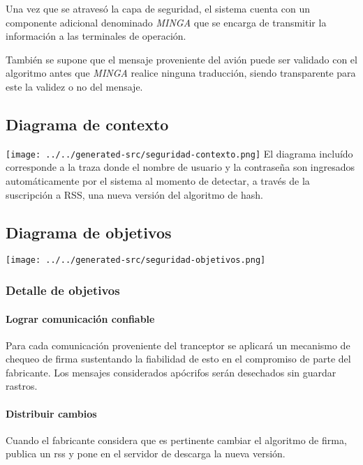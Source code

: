 Una vez que se atravesó la capa de seguridad, el sistema cuenta con un componente adicional denominado \emph{MINGA} que se encarga de transmitir la información a las terminales de operación.

También se supone que el mensaje proveniente del avión puede ser validado con el algoritmo antes que \emph{MINGA} realice ninguna traducción, siendo transparente para este la validez o no del mensaje.

\subsection{Diagrama de contexto}
\texttt{[image: ../../generated-src/seguridad-contexto.png]}
El diagrama incluído corresponde a la traza donde el nombre de usuario y la contraseña son ingresados automáticamente por el sistema al momento de detectar, a través de la suscripción a RSS, una nueva versión del algoritmo de hash.

\subsection{Diagrama de objetivos}
\texttt{[image: ../../generated-src/seguridad-objetivos.png]}

\subsubsection{Detalle de objetivos}
\paragraph{Lograr comunicación confiable}
Para cada comunicación proveniente del tranceptor se aplicará un mecanismo de chequeo de firma sustentando la fiabilidad de esto en el compromiso de parte del fabricante. Los mensajes considerados apócrifos serán desechados sin guardar rastros.
\paragraph{Distribuir cambios}
Cuando el fabricante considera que es pertinente cambiar el algoritmo de firma, publica un rss y pone en el servidor de descarga la nueva versión.
